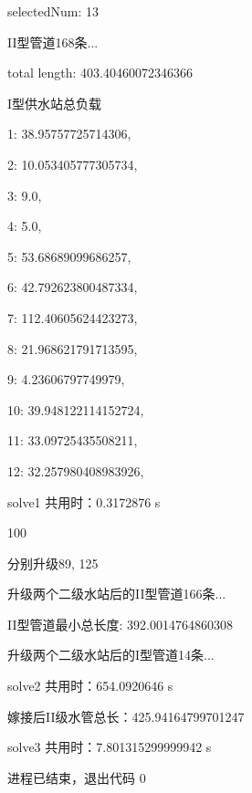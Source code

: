 \documentclass{cumcmthesis}
\begin{document}
\begin{appendices}
selectedNum: 13

II型管道168条...

total length: 403.40460072346366

I型供水站总负载

1: 38.95757725714306, 

2: 10.053405777305734,

3: 9.0, 

4: 5.0, 

5: 53.68689099686257, 

6: 42.792623800487334, 

7: 112.40605624423273, 

8: 21.968621791713595, 

9: 4.23606797749979, 

10: 39.948122114152724, 

11: 33.09725435508211, 

12: 32.257980408983926, 

solve1 共用时：0.3172876 s

100%

分别升级{89, 125}

升级两个二级水站后的II型管道166条... 

II型管道最小总长度: 392.0014764860308

升级两个二级水站后的I型管道14条...

solve2 共用时：654.0920646 s

嫁接后II级水管总长：425.94164799701247

solve3 共用时：7.801315299999942 s

进程已结束，退出代码 0

\end{appendices}
\end{document}
